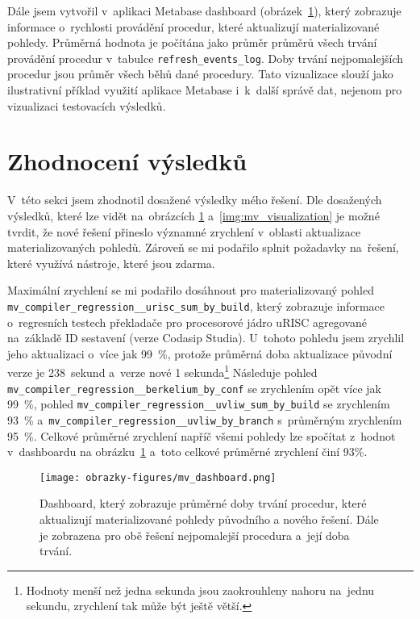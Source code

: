Dále jsem vytvořil v~aplikaci Metabase dashboard (obrázek~\ref{img:mv_dashboard}), který zobrazuje informace
o~rychlosti provádění procedur, které aktualizují materializované pohledy. Průměrná hodnota je počítána jako
průměr průměrů všech trvání provádění procedur v~tabulce \texttt{refresh\_events\_log}. Doby trvání
nejpomalejších procedur jsou průměr všech běhů dané procedury. Tato vizualizace slouží jako ilustrativní příklad využití aplikace Metabase i~k~další správě dat, nejenom pro vizualizaci testovacích výsledků.\vfill

\section{Zhodnocení výsledků}
\label{section:zhodnoceni_vysledku}
V~této sekci jsem zhodnotil dosažené výsledky mého řešení. Dle dosažených výsledků, které lze vidět na~obrázcích \ref{img:mv_dashboard} a~\ref{img:mv_visualization} je možné tvrdit, že nové řešení přineslo
významné zrychlení v~oblasti aktualizace materializovaných pohledů. Zároveň se mi podařilo splnit požadavky
na~řešení, které využívá nástroje, které jsou zdarma.

Maximální zrychlení se mi podařilo dosáhnout pro materializovaný pohled \newline \texttt{mv\_compiler\_regression\_\_urisc\_sum\_by\_build}, který zobrazuje informace o~regresních testech
překladače pro procesorové jádro uRISC agregované na~základě ID sestavení (verze Codasip Studia\textsuperscript{\texttrademark}). U~tohoto pohledu jsem zrychlil jeho aktualizaci o~více jak 99~\%, protože průměrná doba aktualizace původní verze je 238~sekund a~verze nové 1 sekunda\footnote{Hodnoty menší než jedna sekunda jsou zaokrouhleny nahoru na~jednu sekundu, zrychlení tak může být ještě větší.}
Následuje pohled \texttt{mv\_compiler\_regression\_\_berkelium\_by\_conf} se zrychlením opět více jak 99~\%, pohled \texttt{mv\_compiler\_regression\_\_uvliw\_sum\_by\_build} se zrychlením 93~\%
a~\texttt{mv\_compiler\_regression\_\_uvliw\_by\_branch} s~průměrným zrychlením 95~\%. Celkové průměrné zrychlení napříč všemi pohledy lze spočítat z~hodnot v~\mbox{dashboardu} na obrázku~\ref{img:mv_dashboard} a~toto celkové průměrné zrychlení činí 93\%.

\begin{figure}[H]
	\centering
	\texttt{[image: obrazky-figures/mv\_dashboard.png]}
	\caption{Dashboard, který zobrazuje průměrné doby trvání procedur, které aktualizují materializované pohledy původního a nového řešení. Dále je zobrazena pro obě řešení nejpomalejší procedura a~její doba trvání.}
	\label{img:mv_dashboard}
\end{figure}


